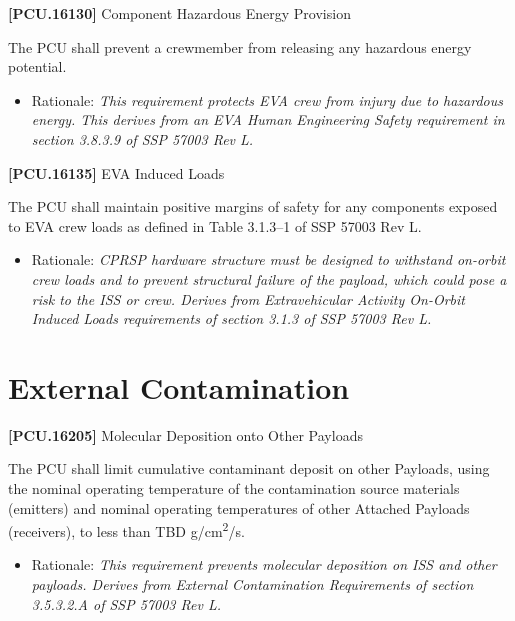 \textbf{[PCU.16130]} Component Hazardous Energy Provision

The \gls{PCU} shall prevent a crewmember from releasing any hazardous energy potential.

\begin{itemize}
\item{} Rationale: \emph{This requirement protects EVA crew from injury due to hazardous energy. This derives from an EVA Human Engineering Safety requirement in section 3.8.3.9 of SSP 57003 Rev L.}

\end{itemize}

\textbf{[PCU.16135]} EVA Induced Loads

The \gls{PCU} shall maintain positive margins of safety for any components exposed to EVA crew loads as defined in Table 3.1.3--1 of SSP 57003 Rev L.

\begin{itemize}
\item{} Rationale: \emph{CPRSP hardware structure must be designed to withstand on-orbit crew loads and to prevent structural failure of the payload, which could pose a risk to the ISS or crew. Derives from Extravehicular Activity On-Orbit Induced Loads requirements of section 3.1.3 of SSP 57003 Rev L.}

\end{itemize}

\section{External Contamination}
\label{externalcontamination}

\textbf{[PCU.16205]} Molecular Deposition onto Other Payloads

The \gls{PCU} shall limit cumulative contaminant deposit on other Payloads, using the nominal operating temperature of the contamination source materials (emitters) and nominal operating temperatures of other Attached Payloads (receivers), to less than TBD\label{tbx_9} g\slash cm\textsuperscript{2}\slash s.

\begin{itemize}
\item{} Rationale: \emph{This requirement prevents molecular deposition on ISS and other payloads. Derives from External Contamination Requirements of section 3.5.3.2.A of SSP 57003 Rev L.}

\end{itemize}

